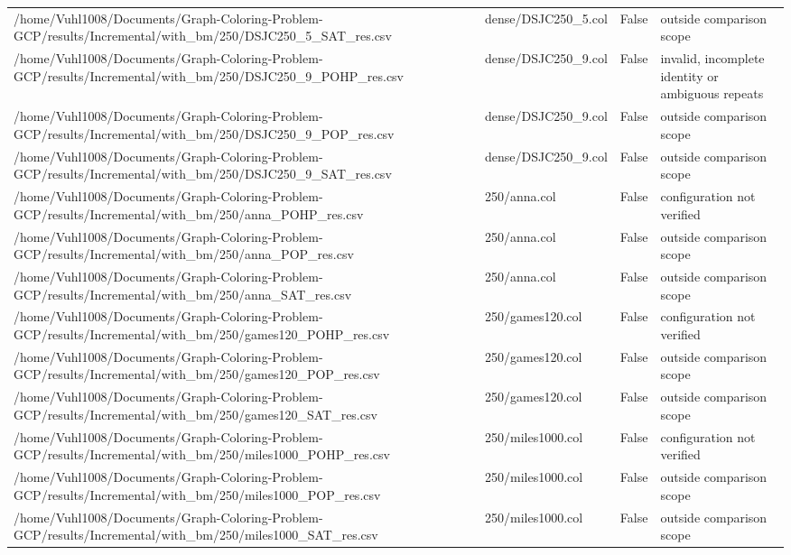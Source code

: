\begin{table}[htbp]
\begin{tabular}{llll}
/home/Vuhl1008/Documents/Graph-Coloring-Problem-GCP/results/Incremental/with\_bm/250/DSJC250\_5\_SAT\_res.csv & dense/DSJC250\_5.col & False & outside comparison scope \\
/home/Vuhl1008/Documents/Graph-Coloring-Problem-GCP/results/Incremental/with\_bm/250/DSJC250\_9\_POHP\_res.csv & dense/DSJC250\_9.col & False & invalid, incomplete identity or ambiguous repeats \\
/home/Vuhl1008/Documents/Graph-Coloring-Problem-GCP/results/Incremental/with\_bm/250/DSJC250\_9\_POP\_res.csv & dense/DSJC250\_9.col & False & outside comparison scope \\
/home/Vuhl1008/Documents/Graph-Coloring-Problem-GCP/results/Incremental/with\_bm/250/DSJC250\_9\_SAT\_res.csv & dense/DSJC250\_9.col & False & outside comparison scope \\
/home/Vuhl1008/Documents/Graph-Coloring-Problem-GCP/results/Incremental/with\_bm/250/anna\_POHP\_res.csv & 250/anna.col & False & configuration not verified \\
/home/Vuhl1008/Documents/Graph-Coloring-Problem-GCP/results/Incremental/with\_bm/250/anna\_POP\_res.csv & 250/anna.col & False & outside comparison scope \\
/home/Vuhl1008/Documents/Graph-Coloring-Problem-GCP/results/Incremental/with\_bm/250/anna\_SAT\_res.csv & 250/anna.col & False & outside comparison scope \\
/home/Vuhl1008/Documents/Graph-Coloring-Problem-GCP/results/Incremental/with\_bm/250/games120\_POHP\_res.csv & 250/games120.col & False & configuration not verified \\
/home/Vuhl1008/Documents/Graph-Coloring-Problem-GCP/results/Incremental/with\_bm/250/games120\_POP\_res.csv & 250/games120.col & False & outside comparison scope \\
/home/Vuhl1008/Documents/Graph-Coloring-Problem-GCP/results/Incremental/with\_bm/250/games120\_SAT\_res.csv & 250/games120.col & False & outside comparison scope \\
/home/Vuhl1008/Documents/Graph-Coloring-Problem-GCP/results/Incremental/with\_bm/250/miles1000\_POHP\_res.csv & 250/miles1000.col & False & configuration not verified \\
/home/Vuhl1008/Documents/Graph-Coloring-Problem-GCP/results/Incremental/with\_bm/250/miles1000\_POP\_res.csv & 250/miles1000.col & False & outside comparison scope \\
/home/Vuhl1008/Documents/Graph-Coloring-Problem-GCP/results/Incremental/with\_bm/250/miles1000\_SAT\_res.csv & 250/miles1000.col & False & outside comparison scope \\

\end{tabular}
\end{table}

